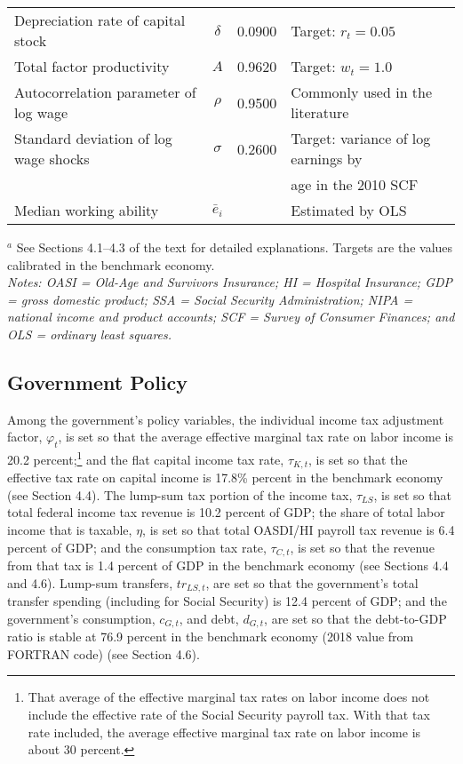 \documentclass[11pt,leqno,fleqn]{article}
\begin{document}
\begin{table}[H]
\begin{center}
\begin{tabular*}{1.0\textwidth}{@{\extracolsep{\fill}}lcrl}
			Depreciation rate of capital stock	& 	$\delta$	& 	0.0900	& 	Target: $r_{t}=0.05$	\\
			Total factor productivity	& 	$A$	& 	0.9620	& 	Target: $w_{t}=1.0$	\\
			Autocorrelation parameter of log wage	& 	$\rho$	& 	0.9500	& 	Commonly used in the literature	\\
			Standard deviation of log wage shocks	& 	$\sigma$	& 	0.2600	& 	Target: variance of log earnings by	\\
			& 		& 		& 	\quad  age in the 2010 SCF	\\
			Median working ability	& 	$\bar{e}_{i}$	& 		& 	Estimated by OLS	\\
			\hline\hline							
		\end{tabular*}							
	\end{center}
	\small $^{a}$ See Sections 4.1--4.3 of the text for detailed explanations. Targets are the values calibrated in the benchmark economy.
	\\
	\itshape Notes\normalfont :  OASI = Old-Age and Survivors Insurance; HI = Hospital Insurance; GDP = gross domestic product; SSA = Social Security Administration; NIPA = national income and product accounts; SCF = Survey of Consumer Finances; and OLS = ordinary least squares. \vspace{1.0in}							
\end{table}	

\subsection{Government Policy}

Among the government's policy variables, the individual income tax adjustment factor, $\varphi_{t}$, is set so that the average effective marginal tax rate on labor income is 20.2 percent;\footnote{That average of the effective marginal tax rates on labor income does not include the effective rate of the Social Security payroll tax. With that tax rate included, the average effective marginal tax rate on labor income is about 30 percent.} and the flat capital income tax rate, $\tau_{K,t}$, is set so that the effective tax rate on capital income is 17.8\% percent in the benchmark economy (see Section 4.4). The lump-sum tax portion of the income tax, $\tau_{LS}$, is set so that total federal income tax revenue is 10.2 percent of GDP; the share of total labor income that is taxable, $\eta$, is set so that total OASDI/HI payroll tax revenue is 6.4 percent of GDP; and the consumption tax rate, $\tau_{C,t}$, is set so that the revenue from that tax is 1.4 percent of GDP in the benchmark economy (see Sections 4.4 and 4.6). Lump-sum transfers, $tr_{LS,t}$, are set so that the government's total transfer spending (including for Social Security) is 12.4 percent of GDP; and the government's consumption, $c_{G,t}$, and debt, $d_{G,t}$, are set so that the debt-to-GDP ratio is stable at 76.9 percent in the benchmark economy (2018 value from FORTRAN code) (see Section 4.6).
\end{document}
